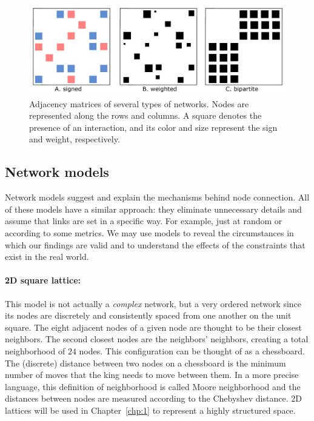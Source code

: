 \begin{figure}[t]
     \centering
\includegraphics[width=\columnwidth]{figures/methods/fig_adjacencies.pdf}
 \caption[Adjacency matrices]{Adjacency matrices of several types of networks. Nodes are represented along the rows and columns. A square denotes the presence of an interaction, and its color and size represent the sign and weight, respectively. }
\label{chp:methods:fig:adjacencies}
\end{figure}

\subsection{Network models}

Network models suggest and explain the mechanisms behind node connection. All of these models have a similar approach: they eliminate unnecessary details and assume that links are set in a specific way. For example, just at random or according to some metrics. We may use models to reveal the circumstances in which our findings are valid and to understand the effects of the constraints that exist in the real world.

\paragraph{2D square lattice:} This model is not actually a \textit{complex} network, but a very ordered network since its nodes are discretely and consistently spaced from one another on the unit square. The eight adjacent nodes of a given node are thought to be their closest neighbors. The second closest nodes are the neighbors' neighbors, creating a total neighborhood of $24$ nodes.  This configuration can be thought of as a chessboard. The (discrete) distance between two nodes on a chessboard is the minimum number of moves that the king needs to move between them. In a more precise language, this definition of neighborhood is called Moore neighborhood and the distances between nodes are measured according to the Chebyshev distance. 2D lattices will be used in Chapter~\ref{chp:1} to represent a highly structured space.

